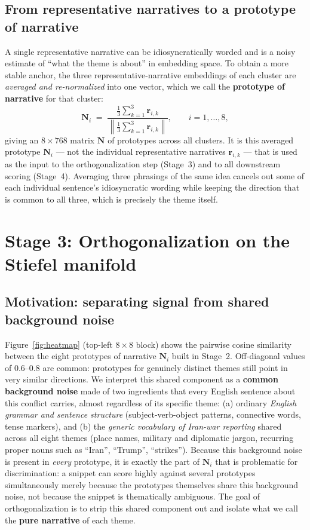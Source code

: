 \documentclass[11pt]{article}
\begin{document}
\subsection{From representative narratives to a prototype of narrative}
A single representative narrative can be idiosyncratically worded and is a
noisy estimate of ``what the theme is about'' in embedding space. To obtain
a more stable anchor, the three representative-narrative embeddings of each
cluster are \emph{averaged and re-normalized} into one vector, which we call
the \textbf{prototype of narrative} for that cluster:
\[
\mathbf{N}_i \;=\; \frac{\tfrac{1}{3}\sum_{k=1}^{3} \mathbf{r}_{i,k}}{\left\lVert \tfrac{1}{3}\sum_{k=1}^{3} \mathbf{r}_{i,k} \right\rVert}, \qquad i = 1,\dots,8,
\]
giving an $8\times 768$ matrix $\mathbf{N}$ of prototypes across all
clusters. It is this averaged prototype $\mathbf{N}_i$ --- not the
individual representative narratives $\mathbf{r}_{i,k}$ --- that is used as
the input to the orthogonalization step (Stage~3) and to all downstream
scoring (Stage~4). Averaging three phrasings of the same idea cancels out
some of each individual sentence's idiosyncratic wording while keeping the
direction that is common to all three, which is precisely the theme itself.

\section{Stage 3: Orthogonalization on the Stiefel manifold}
\label{sec:stage3}

\subsection{Motivation: separating signal from shared background noise}
Figure~\ref{fig:heatmap} (top-left $8\times8$ block) shows the pairwise
cosine similarity between the eight prototypes of narrative $\mathbf{N}_i$
built in Stage~2. Off-diagonal values of $0.6$--$0.8$ are common: prototypes
for genuinely distinct themes still point in very similar directions. We
interpret this shared component as a \textbf{common background noise} made
of two ingredients that every English sentence about this conflict carries,
almost regardless of its specific theme: (a) ordinary \emph{English
grammar and sentence structure} (subject-verb-object patterns, connective
words, tense markers), and (b) the \emph{generic vocabulary of Iran-war
reporting} shared across all eight themes (place names, military and
diplomatic jargon, recurring proper nouns such as ``Iran'', ``Trump'',
``strikes''). Because this background noise is present in \emph{every}
prototype, it is exactly the part of $\mathbf{N}_i$ that is problematic for
discrimination: a snippet can score highly against several prototypes
simultaneously merely because the prototypes themselves share this
background noise, not because the snippet is thematically ambiguous. The
goal of orthogonalization is to strip this shared component out and isolate
what we call the \textbf{pure narrative} of each theme.
\end{document}
